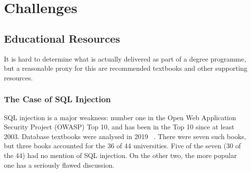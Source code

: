 \documentclass[a4paper,11pt]{article}
\begin{document}




\section*{Challenges} \label{sec}
\subsection*{Educational Resources}\label{sec:EDResource}
It is hard to determine what is actually delivered as part of a degree programme, but a reasonable proxy for this are recommended textbooks and other supporting resources.
\subsubsection*{The Case of SQL Injection}\label{sec:SQL}
SQL injection is a major weakness: number one in the Open Web Application Security Project (OWASP) Top 10, and has been in the Top 10 since at least 2003. Database textbooks were analysed in 2019 ~\cite{Drop2019}.  There were seven such books, but three books accounted for the 36 of 44 universities. Five of the seven (30 of the 44) had no mention of SQL injection. On the other two, the more popular one has a seriously flawed discussion. 
\end{document}
